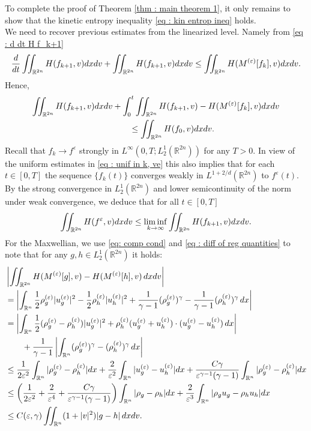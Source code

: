 \documentclass{amsart}
\theoremstyle{plain}
\theoremstyle{remark}
\numberwithin{equation}{section}
\newcommand{\R}{\mathbb{R}}
\newcommand{\ve}{\varepsilon}
\newcommand{\dx}{\textnormal{d}x}
\newcommand{\dv}{\textnormal{d}v}
\begin{document}
To complete the proof of Theorem \ref{thm : main theorem 1}, it only remains to show that the kinetic entropy inequality \eqref{eq : kin entrop ineq} holds.\\
We need to recover previous estimates from the linearized level. Namely from \eqref{eq : d dt H f_k+1}
\begin{align*}
    \frac{\textnormal{d}}{\textnormal{d}t}\iint_{\R^{2n}}H(f_{k+1},v)\dx\dv + \iint_{\R^{2n}} H(f_{k+1},v)\dx\dv \le \iint_{\R^{2n}} H(M^{(\ve)}[f_k],v)\dx\dv.
\end{align*}
Hence,
\begin{equation}
\begin{split}
\label{eq : kin entrop ineq, lin level}
    \iint_{\R^{2n}} H(f_{k+1},v)\dx \dv &+ \int_0^t \iint_{\R^{2n}} H(f_{k+1},v)-H(M^{(\ve)}[f_k],v) \dx \dv \\
    &\qquad \le \iint_{\R^{2n}}H(f_0,v)\dx\dv. 
    \end{split}
\end{equation}
Recall that $f_{k}\to f^\ve$ strongly in $L^\infty(0,T;L^1_2(\R^{2n}))$ for any $T>0$. In view of the uniform estimates in \eqref{eq : unif in k, ve} this also implies that for each $t\in [0,T]$ the sequence $\{f_k(t)\}$ converges weakly in $L^{1+2/d}(\R^{2n})$ to $f^\ve(t)$. By the strong convergence in $L^1_2(\R^{2n})$ and lower semicontinuity of the norm under weak convergence, we deduce that for all $t\in[0,T]$
\begin{align*}
    \iint_{\R^{2n}} H(f^\ve,v)\dx\dv \le \liminf_{k\to\infty} \iint_{\R^{2n}} H(f_{k+1},v)\dx\dv.
\end{align*}
For the Maxwellian, we use \eqref{eq: comp cond} and \eqref{eq : diff of reg quantities} to note that for any $g,h\in L^1_2(\R^{2n})$ it holds:
\begin{align*}
    &\left|\iint_{\R^{2n}} H(M^{(\ve)}[g],v) - H(M^{(\ve)}[h],v) \,\dx\dv \right|\\
    &= \left|\int_{\R^n} \frac{1}{2}\rho^{(\ve)}_{g}|u^{(\ve)}_{g}|^2 - \frac{1}{2}\rho_{h}^{(\ve)}|u_{h}^{(\ve)}|^2 + \frac{1}{\gamma-1}(\rho_{g}^{(\ve)})^\gamma - \frac{1}{\gamma-1}(\rho_{h}^{(\ve)})^\gamma \, \dx \right| \\
    &= \left|\int_{\R^n} \frac{1}{2}(\rho_{g}^{(\ve)} - \rho_{h}^{(\ve)}) |u_{g}^{(\ve)}|^2 + \rho_{h}^{(\ve)} (u_{g}^{(\ve)} + u_{h}^{(\ve)})\cdot (u_{g}^{(\ve)} - u_{h}^{(\ve)}) \, \dx \right|\\
    &\qquad + \frac{1}{\gamma-1}\left|\int_{\R^n} (\rho_{g}^{(\ve)})^\gamma - (\rho_{h}^{(\ve)})^\gamma \, \dx \right|\\
    &\le \frac{1}{2\ve^2}\int_{\R^n} |\rho_g^{(\ve)} - \rho_h^{(\ve)}| \dx + \frac{2}{\ve^2}\int_{\R^n} |u_g^{(\ve)} - u_h^{(\ve)}| \dx + \frac{C\gamma}{\ve^{\gamma-1}(\gamma-1)} \int_{\R^n} |\rho_g^{(\ve)} - \rho_h^{(\ve)}| \dx \\
    &\le \left(\frac{1}{2\ve^2} + \frac{2}{\ve^4} + \frac{C\gamma}{\ve^{\gamma-1}(\gamma-1)}\right) \int_{\R^n} |\rho_g - \rho_h| \dx + \frac{2}{\ve^3}\int_{\R^n} |\rho_g u_g - \rho_h u_h| \dx \\
    &\le C(\ve,\gamma) \iint_{\R^n} (1+|v|^2) |g - h| \,\dx\dv.
\end{align*}
\end{document}
